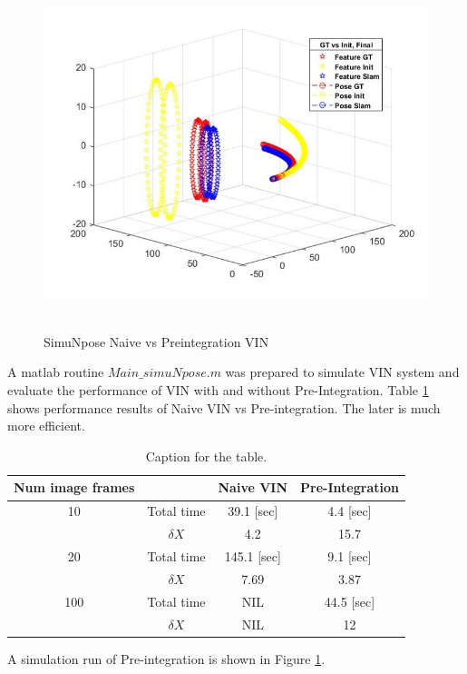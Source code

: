\documentclass[12pt]{article}   %
\begin{document}
\begin{figure}[ht!]
	\includegraphics[height=10.3cm]{figures/SimuNpose_simData.jpg}
	\caption{SimuNpose Naive vs Preintegration VIN}
	\label{fig:simuNpose}
\end{figure}

A matlab routine $Main\_simuNpose.m$ was prepared to simulate VIN system and evaluate the performance of VIN with and without Pre-Integration.
Table \ref{tab:table1} shows performance results of Naive VIN vs Pre-integration. The later is much more efficient.
\begin{table}[h!]
	\centering
	\caption{Caption for the table.}
	\begin{tabular}{cc|c|c}
		Num image frames &  & Naive VIN & Pre-Integration\\
		\hline
		10 & Total time & 39.1 [sec] & 4.4 [sec]\\
		{} & $\delta X$ & 4.2 & 15.7\\
		\hline
		20 & Total time & 145.1 [sec] & 9.1 [sec]\\
		{} & $\delta X$ & 7.69 & 3.87\\
		\hline
		100 & Total time & NIL & 44.5 [sec]\\
		{} & $\delta X$ & NIL & 12\\		
	\end{tabular}
	\label{tab:table1}
\end{table}


A simulation run of Pre-integration is shown in Figure \ref{fig:simuNpose}. 
\end{document}
